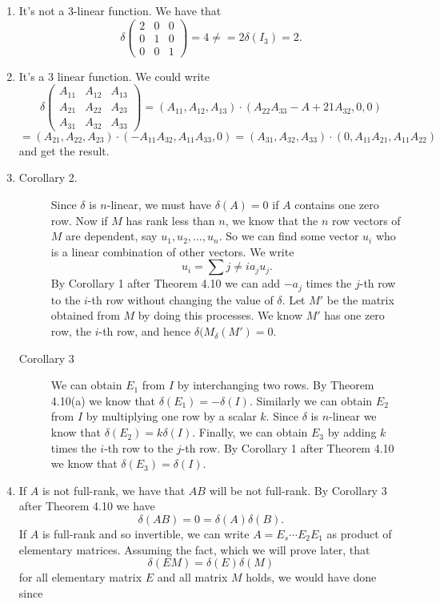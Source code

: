\begin{enumerate}
\item It's not a $3$-linear function. We have that 
\[\delta\begin{pmatrix}2&0&0\\0&1&0\\0&0&1\end{pmatrix}=4\neq =2\delta(I_3)=2.\]
\item It's a $3$ linear function. We could write 
\[\delta\begin{pmatrix}A_{11}&A_{12}&A_{13}\\A_{21}&A_{22}&A_{23}\\A_{31}&A_{32}&A_{33}\end{pmatrix}=(A_{11},A_{12},A_{13})\cdot (A_{22}A_{33}-A+{21}A_{32},0,0)\]
\[=(A_{21},A_{22},A_{23})\cdot (-A_{11}A_{32},A_{11}A_{33},0)=(A_{31},A_{32},A_{33})\cdot (0,A_{11}A_{21},A_{11}A_{22})\]
and get the result.
\item \begin{description}
\item[Corollary 2.] Since $\delta $ is $n$-linear, we must have $\delta(A)=0$ if $A$ contains one zero row. Now if $M$ has rank less than $n$, we know that the $n$ row vectors of $M$ are dependent, say $u_1,u_2,\ldots ,u_n$. So we can find some vector $u_i$ who is a linear combination of other vectors. We write 
\[u_i=\sum{j\neq i}a_ju_j.\]
By Corollary 1 after Theorem 4.10 we can add $-a_j$ times the $j$-th row to the $i$-th row without changing the value of $\delta$. Let $M'$ be the matrix obtained from $M$ by doing this processes. We know $M'$ has one zero row, the $i$-th row, and hence $\delta(M_\delta(M')=0$.
\item[Corollary 3] We can obtain $E_1$ from $I$ by interchanging two rows. By Theorem 4.10(a) we know that $\delta(E_1)=-\delta(I)$. Similarly we can obtain $E_2$ from $I$ by multiplying one row by a scalar $k$. Since $\delta $ is $n$-linear we know that $\delta(E_2)=k\delta(I)$. Finally, we can obtain $E_3$ by adding $k$ times the $i$-th row to the $j$-th row. By Corollary 1 after Theorem 4.10 we know that $\delta(E_3)=\delta(I)$.
\end{description}
\item If $A$ is not full-rank, we have that $AB$ will be not full-rank. By Corollary 3 after Theorem 4.10 we have 
\[\delta(AB)=0=\delta(A)\delta(B).\]
If $A$ is full-rank and so invertible, we can write $A=E_s\cdots E_2E_1$ as product of elementary matrices. Assuming the fact, which we will prove later, that 
\[\delta(EM)=\delta(E)\delta(M)\]
for all elementary matrix $E$ and all matrix $M$ holds, we would have done since 

\end{enumerate}
